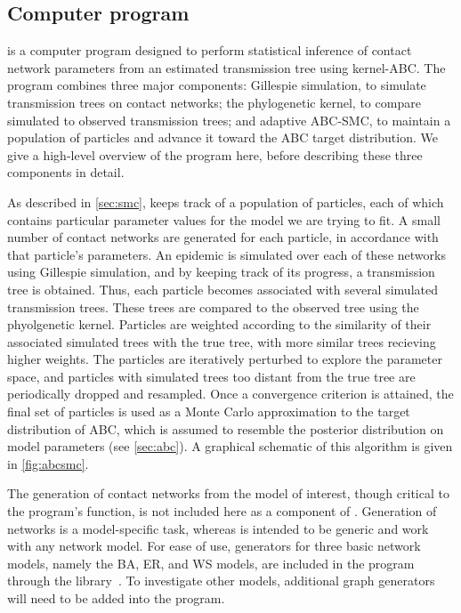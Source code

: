 \subsection{Computer program}

 is a computer program designed to perform statistical
inference of contact network parameters from an estimated transmission tree
using kernel-\gls{ABC}. The program combines three major components: Gillespie
simulation, to simulate transmission trees on contact networks; the
phylogenetic kernel, to compare simulated to observed transmission trees; and
adaptive \gls{ABC}-\gls{SMC}, to maintain a population of particles and
advance it toward the \gls{ABC} target distribution. We give a high-level
overview of the program here, before describing these three components in
detail.

As described in \cref{sec:smc},  keeps track of a population
of particles, each of which contains particular parameter values for the model
we are trying to fit. A small number of contact networks are generated for each
particle, in accordance with that particle's parameters. An epidemic is
simulated over each of these networks using Gillespie simulation, and by
keeping track of its progress, a transmission tree is obtained. Thus, each
particle becomes associated with several simulated transmission trees.  These
trees are compared to the observed tree using the phyolgenetic kernel.
Particles are weighted according to the similarity of their associated
simulated trees with the true tree, with more similar trees recieving higher
weights. The particles are iteratively perturbed to explore the parameter
space, and particles with simulated trees too distant from the true tree are
periodically dropped and resampled. Once a convergence criterion is attained,
the final set of particles is used as a Monte Carlo approximation to the target
distribution of \gls{ABC}, which is assumed to resemble the posterior
distribution on model parameters (see \cref{sec:abc}). A graphical schematic of
this algorithm is given in \cref{fig:abcsmc}.

The generation of contact networks from the model of interest, though critical
to the program's function, is not included here as a component of
.  Generation of networks is a model-specific task, whereas
 is intended to be generic and work with any network model.
For ease of use, generators for three basic network models, namely the
\gls{BA}, \gls{ER}, and \gls{WS} models, are included in the program through
the  library~\autocite{csardi2006igraph}. To investigate other
models, additional graph generators will need to be added into the program.

